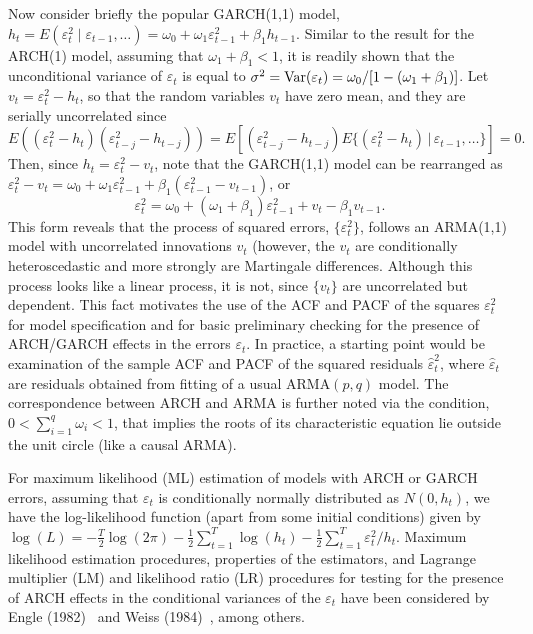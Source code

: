 Now consider briefly the popular GARCH(1,1) model, $h_t = E(\varepsilon_t^2 \;|\; \varepsilon_{t-1}, \ldots) = \omega_0 + \omega_1\varepsilon_{t-1}^2 + \beta_1h_{t-1}$. Similar to the result for the ARCH(1) model, assuming that $\omega_1 + \beta_1 < 1$, it is readily shown that the unconditional variance of $\varepsilon_t$ is equal to $\sigma^2 = \operatorname{Var}(\varepsilon_t) = \omega_0/[1 - (\omega_1 + \beta_1)]$. Let $v_t = \varepsilon_t^2 - h_t$, so that the random variables $v_t$ have zero mean, and they are serially uncorrelated since
	\[
	E( (\varepsilon_t^2 - h_t) (\varepsilon_{t-j}^2 - h_{t-j}) )= E[(\varepsilon_{t-j}^2 - h_{t-j}) E\{(\varepsilon_t^2 - h_t) \,|\, \varepsilon_{t-1},\ldots\}] = 0.
	\]
Then, since $h_t = \varepsilon_t^2 - v_t$, note that the GARCH(1,1) model can be rearranged as $\varepsilon_t^2 - v_t = \omega_0 + \omega_1\varepsilon_{t-1}^2 + \beta_1(\varepsilon_{t-1}^2 - v_{t-1})$, or
	\begin{equation} \label{eqn:2ept}
	\varepsilon_t^2 = \omega_0 + (\omega_1 + \beta_1)\varepsilon_{t-1}^2 + v_t - \beta_1v_{t-1}.
	\end{equation}
This form reveals that the process of squared errors, $\{\varepsilon_t^2\}$, follows an ARMA(1,1) model with uncorrelated innovations $v_t$ (however, the $v_t$ are conditionally heteroscedastic and more strongly are Martingale differences. Although this process looks like a linear process, it is not, since $ \{ v_t \}$ are uncorrelated but dependent. This fact motivates the use of the ACF and PACF of the squares $\varepsilon_t^2$ for model specification and for basic preliminary checking for the presence of ARCH/GARCH effects in the errors $\varepsilon_t$. In practice, a starting point would be examination of the sample ACF and PACF of the squared residuals $\hat{\varepsilon}_t^2$, where $\hat{\varepsilon}_t$ are residuals obtained from fitting of a usual ARMA$(p,q)$ model. The correspondence between ARCH and ARMA is further noted via the condition, $0 < \sum_{i=1}^q \omega_i < 1$, that implies the roots of its characteristic equation lie outside the unit circle (like a causal ARMA).


For maximum likelihood (ML) estimation of models with ARCH or GARCH errors, assuming that $\varepsilon_t$ is conditionally normally distributed as $N(0,h_t)$, we have the log-likelihood function (apart from some initial conditions) given by $\log(L) = -\frac{T}{2} \log(2\pi) - \frac{1}{2} \sum_{t=1}^T \log(h_t) - \frac{1}{2} \sum_{t=1}^T \varepsilon_t^2/h_t$. Maximum likelihood estimation procedures, properties of the estimators, and Lagrange multiplier (LM) and likelihood ratio (LR) procedures for testing for the presence of ARCH effects in the conditional variances of the $\varepsilon_t$ have been considered by Engle (1982)~\cite{engle1982} and Weiss (1984)~\cite{weiss1984}, among others.


